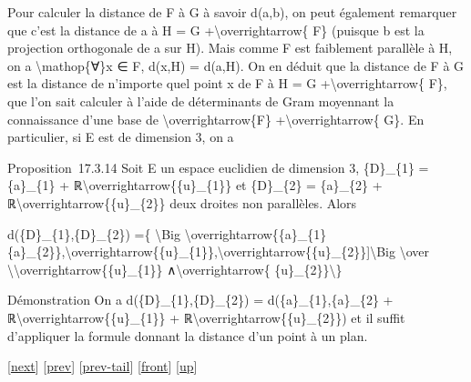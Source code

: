 \documentclass[]{article}
\begin{document}
Pour calculer la distance de F à G à savoir d(a,b), on peut également
remarquer que c'est la distance de a à H = G
+\textbackslash{}overrightarrow\{ F\} (puisque b est la projection
orthogonale de a sur H). Mais comme F est faiblement parallèle à H, on a
\textbackslash{}mathop\{∀\}x ∈ F, d(x,H) = d(a,H). On en déduit que la
distance de F à G est la distance de n'importe quel point x de F à H = G
+\textbackslash{}overrightarrow\{ F\}, que l'on sait calculer à l'aide
de déterminants de Gram moyennant la connaissance d'une base de
\textbackslash{}overrightarrow\{F\} +\textbackslash{}overrightarrow\{
G\}. En particulier, si E est de dimension 3, on a

Proposition~17.3.14 Soit E un espace euclidien de dimension 3,
\{D\}\_\{1\} = \{a\}\_\{1\} +
ℝ\textbackslash{}overrightarrow\{\{u\}\_\{1\}\} et \{D\}\_\{2\} =
\{a\}\_\{2\} + ℝ\textbackslash{}overrightarrow\{\{u\}\_\{2\}\} deux
droites non parallèles. Alors

d(\{D\}\_\{1\},\{D\}\_\{2\}) =\{ \textbackslash{}Big
\textbar{}{[}\textbackslash{}overrightarrow\{\{a\}\_\{1\}\{a\}\_\{2\}\},\textbackslash{}overrightarrow\{\{u\}\_\{1\}\},\textbackslash{}overrightarrow\{\{u\}\_\{2\}\}{]}\textbackslash{}Big
\textbar{} \textbackslash{}over
\textbackslash{}\textbar{}\textbackslash{}overrightarrow\{\{u\}\_\{1\}\}
∧\textbackslash{}overrightarrow\{
\{u\}\_\{2\}\}\textbackslash{}\textbar{}\}

Démonstration On a d(\{D\}\_\{1\},\{D\}\_\{2\}) =
d(\{a\}\_\{1\},\{a\}\_\{2\} +
ℝ\textbackslash{}overrightarrow\{\{u\}\_\{1\}\} +
ℝ\textbackslash{}overrightarrow\{\{u\}\_\{2\}\}) et il suffit
d'appliquer la formule donnant la distance d'un point à un plan.

{[}\href{coursse95.html}{next}{]} {[}\href{coursse93.html}{prev}{]}
{[}\href{coursse93.html\#tailcoursse93.html}{prev-tail}{]}
{[}\href{coursse94.html}{front}{]}
{[}\href{coursch18.html\#coursse94.html}{up}{]}
\end{document}
